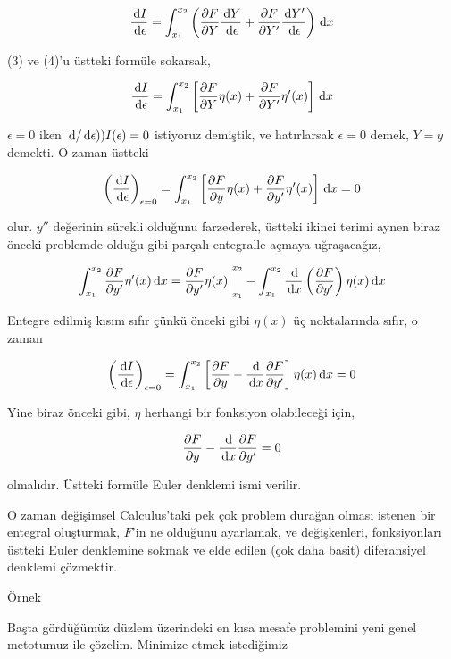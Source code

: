 \documentclass[12pt,fleqn]{article}\usepackage{../../common}
\begin{document}
$$
\frac{\,\mathrm{d} I}{\,\mathrm{d} \epsilon}  = 
\int_{x_1}^{x_2} \left(
\frac{\partial F}{\partial Y} \frac{\,\mathrm{d} Y}{\,\mathrm{d} \epsilon} + 
\frac{\partial F}{\partial Y'} \frac{\,\mathrm{d} Y'}{\,\mathrm{d} \epsilon} 
\right) \,\mathrm{d} x
$$

(3) ve (4)'u üstteki formüle sokarsak, 

$$
\frac{\,\mathrm{d} I}{\,\mathrm{d} \epsilon}  = 
\int_{x_1}^{x_2}
\left[
\frac{\partial F}{\partial Y} \eta(x) + 
\frac{\partial F}{\partial Y'} \eta'(x) 
\right] \,\mathrm{d} x
$$

$\epsilon = 0$ iken $ \,\mathrm{d} / \,\mathrm{d} \epsilon) ) I(\epsilon) = 0$ istiyoruz
demiştik, ve hatırlarsak $\epsilon = 0$ demek, $Y = y$ demekti. O zaman
üstteki 

$$
\left( \frac{\,\mathrm{d} I}{\,\mathrm{d} \epsilon} \right)_{\epsilon = 0} = 
\int_{x_1}^{x_2}
\left[
\frac{\partial F}{\partial y} \eta(x) + 
\frac{\partial F}{\partial y'} \eta'(x) 
\right] \,\mathrm{d} x = 0
$$

olur. $y''$ değerinin sürekli olduğunu farzederek, üstteki ikinci terimi
aynen biraz önceki problemde olduğu gibi parçalı entegralle açmaya
uğraşacağız,

$$
\int_{x_1}^{x_2} \frac{\partial F}{\partial y'} \eta'(x) \,\mathrm{d} x = 
\frac{\partial F}{\partial y'} \eta(x) \bigg\vert_{x_1}^{x_2} - 
\int_{x_1}^{x_2} \frac{\,\mathrm{d} }{\,\mathrm{d} x} \left( \frac{\partial F}{\partial y'}  \right)
\eta(x) \,\mathrm{d} x
$$

Entegre edilmiş kısım sıfır çünkü önceki gibi $\eta(x)$ üç noktalarında
sıfır, o zaman 

$$
\left( \frac{\,\mathrm{d} I}{\,\mathrm{d} \epsilon} \right)_{\epsilon = 0} = 
\int_{x_1}^{x_2} \left[
\frac{\partial F}{\partial y} - 
\frac{\,\mathrm{d} }{\,\mathrm{d} x} \frac{\partial F}{\partial y'}
\right] \eta(x) \,\mathrm{d} x = 0
$$

Yine biraz önceki gibi, $\eta$ herhangi bir fonksiyon olabileceği için,

$$
\frac{\partial F}{\partial y} - 
\frac{\,\mathrm{d} }{\,\mathrm{d} x} \frac{\partial F}{\partial y'} = 0
$$

olmalıdır. Üstteki formüle Euler denklemi ismi verilir. 

O zaman değişimsel Calculus'taki pek çok problem durağan olması istenen bir
entegral oluşturmak, $F$'in ne olduğunu ayarlamak, ve değişkenleri,
fonksiyonları üstteki Euler denklemine sokmak ve elde edilen (çok daha
basit) diferansiyel denklemi çözmektir.

Örnek

Başta gördüğümüz düzlem üzerindeki en kısa mesafe problemini yeni genel
metotumuz ile çözelim. Minimize etmek istediğimiz
\end{document}
